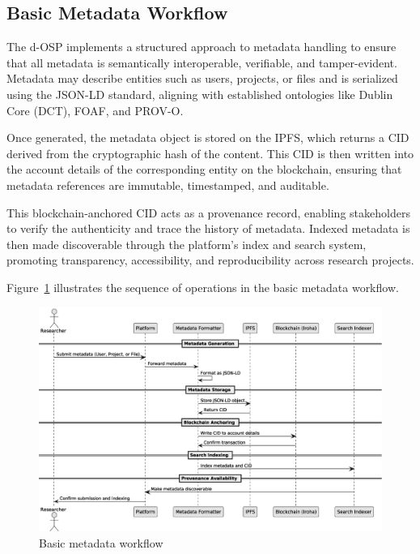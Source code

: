\documentclass[final]{rc-book-2.14}
\begin{document}
\subsection{Basic Metadata Workflow}

The d-OSP implements a structured approach to metadata handling to ensure that all metadata is semantically interoperable, verifiable, and tamper-evident. Metadata may describe entities such as users, projects, or files and is serialized using the JSON-LD standard, aligning with established ontologies like Dublin Core (DCT), FOAF, and PROV-O.

Once generated, the metadata object is stored on the IPFS, which returns a CID derived from the cryptographic hash of the content. This CID is then written into the account details of the corresponding entity on the blockchain, ensuring that metadata references are immutable, timestamped, and auditable.

This blockchain-anchored CID acts as a provenance record, enabling stakeholders to verify the authenticity and trace the history of metadata. Indexed metadata is then made discoverable through the platform’s index and search system, promoting transparency, accessibility, and reproducibility across research projects.

Figure~\ref{fig:metadata_workflow} illustrates the sequence of operations in the basic metadata workflow.

\begin{figure}[htbp]
    \centering
    \includegraphics[scale=0.38]{fig/metadata_workflow_sequence_2.eps}
    \caption{Basic metadata workflow}
    \label{fig:metadata_workflow}
\end{figure}
\end{document}
